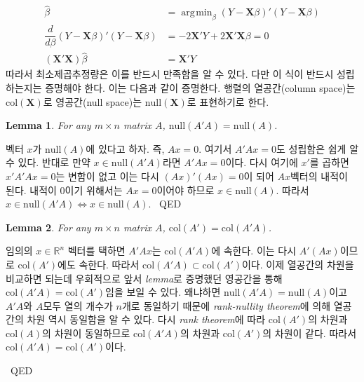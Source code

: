 \documentclass[answers]{exam}
\DeclareMathOperator*{\argmin}{\arg\!\min}
\newcommand{\bs}{\boldsymbol}
\newtheorem{lemma}{Lemma}
\newenvironment{proof}{{\sc Proof:}}{~\hfill QED}
\begin{document}
\begin{questions}
\begin{solution}
\begin{enumerate}[(a)]
      \begin{align}
        \widehat{\beta} &= \argmin_{\beta}\left(Y-\mathbf{X}\beta\right)'\left(Y-\mathbf{X}\beta\right)\\
        \dfrac{d}{d\beta}\left(Y-\mathbf{X}\beta\right)'\left(Y-\mathbf{X}\beta\right) &= -2\mathbf{X}'Y+2\mathbf{X}'\mathbf{X}\beta = 0\\
        \left(\mathbf{X}'\mathbf{X}\right)\widehat{\beta} &= \mathbf{X}'Y
      \end{align}
      따라서 최소제곱추정량은 이를 반드시 만족함을 알 수 있다. 다만 이 식이 반드시 성립하는지는 증명해야 한다. 이는 다음과 같이 증명한다. 행렬의 열공간(column space)는 $\bs{\mathrm{col}}\left(\mathbf{X}\right)$로 영공간(null space)는 $\bs{\mathrm{null}}\left(\mathbf{X}\right)$로 표현하기로 한다. \par
      \begin{lemma}
        For any $m\times n$ matrix $A$, $\bs{\mathrm{null}}\left(A'A\right)=\bs{\mathrm{null}}\left(A\right)$.
      \end{lemma}
      \begin{proof}
        벡터 $x$가 $\bs{\mathrm{null}}\left(A\right)$에 있다고 하자. 즉, $Ax=0$. 여기서 $A'Ax=0$도 성립함은 쉽게 알 수 있다. 반대로 만약 $x\in\bs{\mathrm{null}}\left(A'A\right)$라면 $A'Ax=0$이다. 다시 여기에 $x'$를 곱하면 $x'A'Ax=0$는 변함이 없고 이는 다시 $\left(Ax\right)'\left(Ax\right)=0$이 되어 $Ax$벡터의 내적이 된다. 내적이 0이기 위해서는 $Ax=0$이어야 하므로 $x\in\bs{\mathrm{null}}\left(A\right)$. 따라서 $x\in\bs{\mathrm{null}}\left(A'A\right)\iff x\in\bs{\mathrm{null}}\left(A\right)$.
      \end{proof}
      \begin{lemma}
        For any $m\times n$ matrix $A$, $\bs{\mathrm{col}}\left(A'\right)=\bs{\mathrm{col}}\left(A'A\right)$.
      \end{lemma}
      \begin{proof}
        임의의 $x\in\mathbb{R}^{n}$ 벡터를 택하면 $A'Ax$는 $\bs{\mathrm{col}}\left(A'A\right)$에 속한다. 이는 다시 $A'\left(Ax\right)$이므로 $\bs{\mathrm{col}}\left(A'\right)$에도 속한다. 따라서 $\bs{\mathrm{col}}\left(A'A\right)\subset \bs{\mathrm{col}}\left(A'\right)$이다. 이제 열공간의 차원을 비교하면 되는데 우회적으로 앞서 \emph{lemma}로 증명했던 영공간을 통해 $\bs{\mathrm{col}}\left(A'A\right)=\bs{\mathrm{col}}\left(A'\right)$임을 보일 수 있다. 왜냐하면 $\bs{\mathrm{null}}\left(A'A\right)=\bs{\mathrm{null}}\left(A\right)$이고 $A'A$와 $A$모두 열의 개수가 $n$개로 동일하기 때문에 \emph{rank-nullity theorem}에 의해 열공간의 차원 역시 동일함을 알 수 있다. 다시 \emph{rank theorem}에 따라 $\bs{\mathrm{col}}\left(A'\right)$의 차원과 $\bs{\mathrm{col}}\left(A\right)$의 차원이 동일하므로 $\bs{\mathrm{col}}\left(A'A\right)$의 차원과 $\bs{\mathrm{col}}\left(A'\right)$의 차원이 같다. 따라서 $\bs{\mathrm{col}}\left(A'A\right)=\bs{\mathrm{col}}\left(A'\right)$이다.\par

\end{proof}
\end{enumerate}
\end{solution}
\end{questions}
\end{document}
